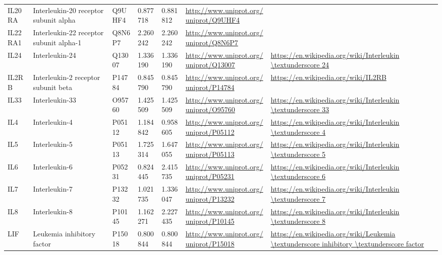 \begin{table}[H]
{\begin{tabular}{ lllllll }
        \multicolumn{1}{l|}{ IL20RA } &  Interleukin-20 receptor subunit alpha   & Q9UHF4   & 0.877718   & 0.881812   & \url{http://www.uniprot.org/uniprot/Q9UHF4}   &           \\ 
        \multicolumn{1}{l|}{ IL22RA1 } &  Interleukin-22 receptor subunit alpha-1   & Q8N6P7   & 2.260242   & 2.260242   & \url{http://www.uniprot.org/uniprot/Q8N6P7}   &           \\ 
        \multicolumn{1}{l|}{ IL24 } &  Interleukin-24   & Q13007   & 1.336190   & 1.336190   & \url{http://www.uniprot.org/uniprot/Q13007}   & \url{https://en.wikipedia.org/wiki/Interleukin \textunderscore 24}          \\ 
        \multicolumn{1}{l|}{ IL2RB } &  Interleukin-2 receptor subunit beta   & P14784   & 0.845790   & 0.845790   & \url{http://www.uniprot.org/uniprot/P14784}   & \url{https://en.wikipedia.org/wiki/IL2RB}          \\ 
        \multicolumn{1}{l|}{ IL33 } &  Interleukin-33   & O95760   & 1.425509   & 1.425509   & \url{http://www.uniprot.org/uniprot/O95760}   & \url{https://en.wikipedia.org/wiki/Interleukin \textunderscore 33}          \\ 
        \multicolumn{1}{l|}{ IL4 } &  Interleukin-4   & P05112   & 1.184842   & 0.958605   & \url{http://www.uniprot.org/uniprot/P05112}   & \url{https://en.wikipedia.org/wiki/Interleukin \textunderscore 4}          \\ 
        \multicolumn{1}{l|}{ IL5 } &  Interleukin-5   & P05113   & 1.725314   & 1.647055   & \url{http://www.uniprot.org/uniprot/P05113}   & \url{https://en.wikipedia.org/wiki/Interleukin \textunderscore 5}          \\ 
        \multicolumn{1}{l|}{ IL6 } &  Interleukin-6   & P05231   & 0.824445   & 2.415735   & \url{http://www.uniprot.org/uniprot/P05231}   & \url{https://en.wikipedia.org/wiki/Interleukin \textunderscore 6}          \\ 
        \multicolumn{1}{l|}{ IL7 } &  Interleukin-7   & P13232   & 1.021735   & 1.336047   & \url{http://www.uniprot.org/uniprot/P13232}   & \url{https://en.wikipedia.org/wiki/Interleukin \textunderscore 7}          \\ 
        \multicolumn{1}{l|}{ IL8 } &  Interleukin-8   & P10145   & 1.162271   & 2.227435   & \url{http://www.uniprot.org/uniprot/P10145}   & \url{https://en.wikipedia.org/wiki/Interleukin \textunderscore 8}          \\ 
        \multicolumn{1}{l|}{ LIF } &  Leukemia inhibitory factor   & P15018   & 0.800844   & 0.800844   & \url{http://www.uniprot.org/uniprot/P15018}   & \url{https://en.wikipedia.org/wiki/Leukemia \textunderscore inhibitory \textunderscore factor}          \\ 

\end{tabular}}
\end{table}
